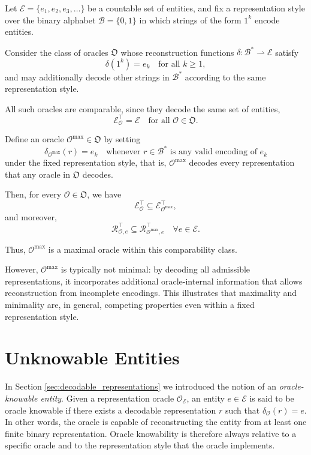 \begin{example}
\label{ex:maximal_oracle_fixed_style}
Let $\mathcal{E}=\{e_1,e_2,e_3,\dots\}$ be a countable set of entities, and fix a representation style over the binary alphabet $\mathcal{B}=\{0,1\}$ in which strings of the form $1^k$ encode entities.

Consider the class of oracles $\mathfrak{O}$ whose reconstruction functions $\delta:\mathcal{B}^\ast\rightharpoonup \mathcal{E}$ satisfy
\[
\delta(1^k)=e_k \quad \text{for all } k\ge 1,
\]
and may additionally decode other strings in $\mathcal{B}^\ast$ according to the same representation style.

All such oracles are comparable, since they decode the same set of entities,
\[
\mathcal{E}^\top_{\mathcal{O}}=\mathcal{E}
\quad \text{for all } \mathcal{O}\in\mathfrak{O}.
\]

Define an oracle $\mathcal{O}^{\max}\in\mathfrak{O}$ by setting
\[
\delta_{\mathcal{O}^{\max}}(r)=e_k
\quad \text{whenever } r \in \mathcal{B}^\ast \text{ is any valid encoding of } e_k
\]
under the fixed representation style, that is, $\mathcal{O}^{\max}$ decodes every representation that any oracle in $\mathfrak{O}$ decodes.

Then, for every $\mathcal{O}\in\mathfrak{O}$, we have
\[
\mathcal{E}^\top_{\mathcal{O}} \subseteq \mathcal{E}^\top_{\mathcal{O}^{\max}},
\]
and moreover,
\[
\mathcal{R}^\top_{\mathcal{O},e}
\subseteq
\mathcal{R}^\top_{\mathcal{O}^{\max},e}
\quad \forall e\in\mathcal{E}.
\]

Thus, $\mathcal{O}^{\max}$ is a maximal oracle within this comparability class.

However, $\mathcal{O}^{\max}$ is typically not minimal: by decoding all admissible representations, it incorporates additional oracle-internal information that allows reconstruction from incomplete encodings. This illustrates that maximality and minimality are, in general, competing properties even within a fixed representation style.
\end{example}

%
%

\section{Unknowable Entities}

In Section \ref{sec:decodable_representations} we introduced the notion of an \emph{oracle-knowable entity}. Given a representation oracle $\mathcal{O}_{\mathcal{E}}$, an entity  $e \in \mathcal{E}$ is said to be oracle knowable if there exists a decodable representation $r$ such that $\delta_{\mathcal O}(r)=e$. In other words, the oracle is capable of reconstructing the entity from at least one finite binary representation. Oracle knowability is therefore always relative to a specific oracle and to the representation style that the oracle implements.

